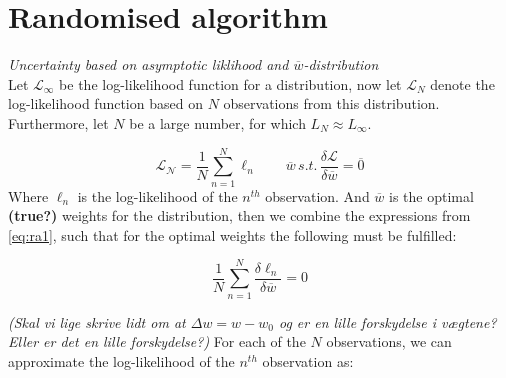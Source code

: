 \section{Randomised algorithm}
\emph{Uncertainty based on asymptotic liklihood and $\overline{w}$-distribution}\\
Let $\mathcal{L}_\infty$ be the log-likelihood function for a distribution, now let $\mathcal{L}_N$ denote the log-likelihood function based on $N$ observations from this distribution. Furthermore, let $N$ be a large number, for which $L_N \approx L_\infty$. 

\begin{equation}
\mathcal{L_N} = \frac{1}{N} \sum_{n=1}^N \ell_n \qquad \overline{w} \, s.t. \, \frac{\delta \mathcal{L}}{\delta \overline{w}} = \overline{0} \label{eq:ra1}
\end{equation}
Where $\ell_n$ is the log-likelihood of the $n^{th}$ observation. And $\overline{w}$ is the optimal \textbf{(true?)} weights for the distribution, then we combine the expressions from \eqref{eq:ra1}, such that for the optimal weights the following must be fulfilled:

\begin{equation}
\frac{1}{N} \sum_{n = 1}^N \frac{\delta \ell_n}{\delta \overline{w}} = 0 \label{eq:ra2}
\end{equation}

\emph{(Skal vi lige skrive lidt om at $\Delta w = w-w_0$ og er en lille forskydelse i vægtene? Eller er det en lille forskydelse?) }
For each of the $N$ observations, we can approximate the log-likelihood of the $n^{th}$ observation as:

